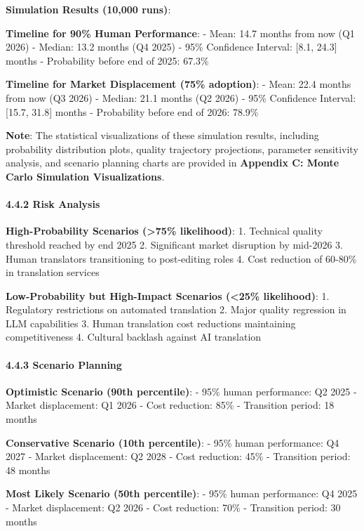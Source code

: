 \documentclass[12pt,a4paper]{article}
\begin{document}
{{{\textbf{Simulation Results (10,000 runs)}:

\textbf{Timeline for 90\% Human Performance}: - Mean: 14.7 months from
now (Q1 2026) - Median: 13.2 months (Q4 2025) - 95\% Confidence
Interval: {[}8.1, 24.3{]} months - Probability before end of 2025:
67.3\%

\textbf{Timeline for Market Displacement (75\% adoption)}: - Mean: 22.4
months from now (Q3 2026) - Median: 21.1 months (Q2 2026) - 95\%
Confidence Interval: {[}15.7, 31.8{]} months - Probability before end of
2026: 78.9\%

\textbf{Note}: The statistical visualizations of these simulation results, including probability distribution plots, quality trajectory projections, parameter sensitivity analysis, and scenario planning charts are provided in \textbf{Appendix C: Monte Carlo Simulation Visualizations}.

\hypertarget{risk-analysis}{%
\paragraph{4.4.2 Risk Analysis}\label{risk-analysis}}

\textbf{High-Probability Scenarios (\textgreater75\% likelihood)}: 1.
Technical quality threshold reached by end 2025 2. Significant market
disruption by mid-2026 3. Human translators transitioning to
post-editing roles 4. Cost reduction of 60-80\% in translation services

\textbf{Low-Probability but High-Impact Scenarios (\textless25\%
likelihood)}: 1. Regulatory restrictions on automated translation 2.
Major quality regression in LLM capabilities 3. Human translation cost
reductions maintaining competitiveness 4. Cultural backlash against AI
translation

\hypertarget{scenario-planning}{%
\paragraph{4.4.3 Scenario Planning}\label{scenario-planning}}

\textbf{Optimistic Scenario (90th percentile)}: - 95\% human
performance: Q2 2025 - Market displacement: Q1 2026 - Cost reduction:
85\% - Transition period: 18 months

\textbf{Conservative Scenario (10th percentile)}: - 95\% human
performance: Q4 2027 - Market displacement: Q2 2028 - Cost reduction:
45\% - Transition period: 48 months

\textbf{Most Likely Scenario (50th percentile)}: - 95\% human
performance: Q4 2025 - Market displacement: Q2 2026 - Cost reduction:
70\% - Transition period: 30 months

}}}
\end{document}
